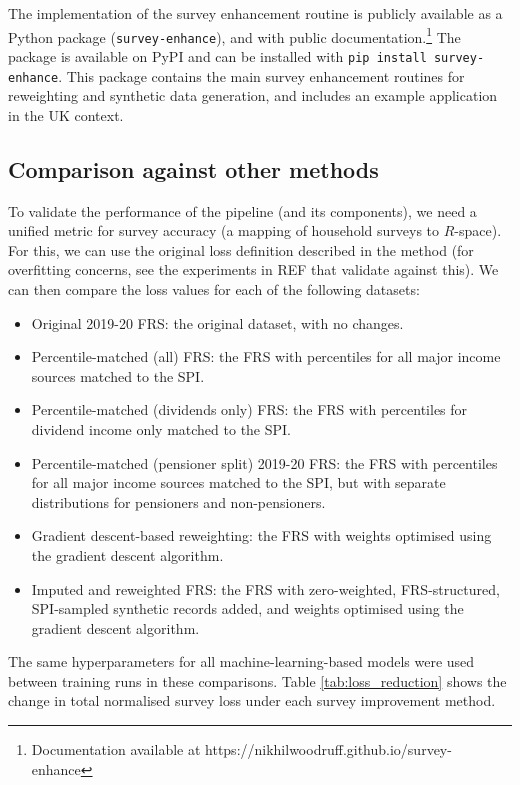 \documentclass[10pt,journal,compsoc]{IEEEtran}
\begin{document}
The implementation of the survey enhancement routine is publicly available as a Python package (\texttt{survey-enhance}), and with public documentation.\footnote{Documentation available at https://nikhilwoodruff.github.io/survey-enhance} The package is available on PyPI and can be installed with \texttt{pip install survey-enhance}. This package contains the main survey enhancement routines for reweighting and synthetic data generation, and includes an example application in the UK context.

\subsection{Comparison against other methods}

To validate the performance of the pipeline (and its components), we need a unified metric for survey accuracy (a mapping of household surveys to $R$-space). For this, we can use the original loss definition described in the method (for overfitting concerns, see the experiments in REF that validate against this). We can then compare the loss values for each of the following datasets:

\begin{itemize}
  \item Original 2019-20 FRS: the original dataset, with no changes.
  \item Percentile-matched (all) FRS: the FRS with percentiles for all major income sources matched to the SPI.
  \item Percentile-matched (dividends only) FRS: the FRS with percentiles for dividend income only matched to the SPI.
  \item Percentile-matched (pensioner split) 2019-20 FRS: the FRS with percentiles for all major income sources matched to the SPI, but with separate distributions for pensioners and non-pensioners.
  \item Gradient descent-based reweighting: the FRS with weights optimised using the gradient descent algorithm.
  \item Imputed and reweighted FRS: the FRS with zero-weighted, FRS-structured, SPI-sampled synthetic records added, and weights optimised using the gradient descent algorithm.
\end{itemize}

The same hyperparameters for all machine-learning-based models were used between training runs in these comparisons. Table \ref{tab:loss_reduction} shows the change in total normalised survey loss under each survey improvement method.
\end{document}
